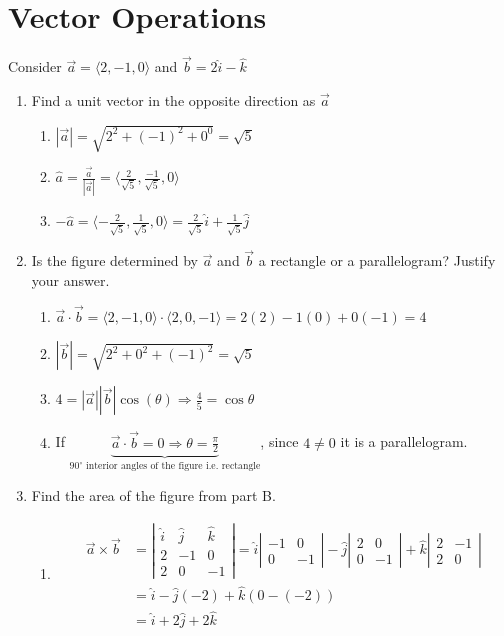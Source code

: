 \documentclass[letter,11pt]{article}
\begin{document}
\section{Vector Operations}
Consider $\vec{a} = \langle 2,-1,0 \rangle$ and $\vec{b} = 2\hat{i} - \hat{k}$
\begin{enumerate}[label=\Alph*.]
    \item Find a unit vector in the opposite direction as $\vec{a}$
        \begin{enumerate}
            \item $|\vec{a}| = \sqrt{2^2+(-1)^2+0^0} = \sqrt{5}$
            \item $\hat{a} = \frac{\vec{a}}{|\vec{a}|} = \langle \frac{2}{\sqrt{5}}, \frac{-1}{\sqrt{5}}, 0 \rangle$
            \item $-\hat{a} = \langle -\frac{2}{\sqrt{5}}, \frac{1}{\sqrt{5}}, 0 \rangle = \boxed{\frac{2}{\sqrt{5}}\hat{i} + \frac{1}{\sqrt{5}}\hat{j}}$         
        \end{enumerate}
    \item Is the figure determined by $\vec{a}$ and $\vec{b}$ a rectangle or a parallelogram? Justify your answer.
    \begin{enumerate}
        \item $\vec{a} \cdot \vec{b} = \langle 2,-1,0\rangle \cdot \langle 2,0,-1\rangle = 2(2)-1(0)+0(-1) = 4$
        \item $|\vec{b}| = \sqrt{2^2+0^2+(-1)^2}=\sqrt{5}$
        \item $4 = |\vec{a}||\vec{b}| \cos(\theta) \Longrightarrow \frac{4}{5} = \cos \theta $
        \item If $ \underbrace{\vec{a} \cdot \vec{b} = 0 \Longrightarrow \theta = \frac{\pi}{2}}_{90^{\circ} \text{ interior angles of the figure i.e. rectangle}}$, since $ 4 \neq 0$ it is a parallelogram. 
    \end{enumerate}
    \item Find the area of the figure from part B.
    \begin{enumerate}
        \item \begin{align*} \vec{a} \times \vec{b} &= \left|\begin{matrix} \hat{i} & \hat{j} & \hat{k}\\ 2 & -1 & 0 \\ 2 & 0 & -1 \end{matrix} \right| = \hat{i} \left|\begin{matrix} -1 & 0 \\ 0 & -1\end{matrix} \right| - \hat{j} \left|\begin{matrix} 2 & 0 \\ 0 & -1\end{matrix} \right|+ \hat{k} \left|\begin{matrix} 2 & -1 \\ 2 & 0\end{matrix} \right|\\ &= \hat{i} - \hat{j}(-2)+\hat{k}(0-(-2))\\ &= \hat{i} + 2\hat{j}+ 2\hat{k}

\end{align*}
\end{enumerate}
\end{enumerate}
\end{document}
